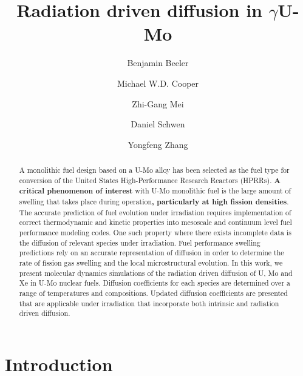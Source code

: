 \documentclass[review]{elsarticle}
\providecommand{\DIFaddtex}[1]{{\bf #1}} %
\providecommand{\DIFdeltex}[1]{} %
\providecommand{\DIFaddbegin}{\protect\color{blue}} %
\providecommand{\DIFaddend}{\protect\color{black}} %
\providecommand{\DIFdelbegin}{\protect\color{red}} %
\providecommand{\DIFdelend}{\protect\color{black}} %
\providecommand{\DIFadd}[1]{\texorpdfstring{\DIFaddtex{#1}}{#1}} %
\providecommand{\DIFdel}[1]{\texorpdfstring{\DIFdeltex{#1}}{}} %
\newcommand{\DIFscaledelfig}{0.5}
\newlength{\DIFdelgraphicswidth} %
\newlength{\DIFdelgraphicsheight} %
\newcommand{\DIFaddincludegraphics}[2][]{{\color{blue}\fbox{\DIFOincludegraphics[#1]{#2}}}} %
\newcommand{\DIFdelincludegraphics}[2][]{%
\sbox{\DIFdelgraphicsbox}{\DIFOincludegraphics[#1]{#2}}%
\settoboxwidth{\DIFdelgraphicswidth}{\DIFdelgraphicsbox} %
\settoboxtotalheight{\DIFdelgraphicsheight}{\DIFdelgraphicsbox} %
\scalebox{\DIFscaledelfig}{%
\parbox[b]{\DIFdelgraphicswidth}{\usebox{\DIFdelgraphicsbox}\\[-\baselineskip] \rule{\DIFdelgraphicswidth}{0em}}\llap{\resizebox{\DIFdelgraphicswidth}{\DIFdelgraphicsheight}{%
\setlength{\unitlength}{\DIFdelgraphicswidth}%
\begin{picture}(1,1)%
\thicklines\linethickness{2pt} %
{\color[rgb]{1,0,0}\put(0,0){\framebox(1,1){}}}%
{\color[rgb]{1,0,0}\put(0,0){\line( 1,1){1}}}%
{\color[rgb]{1,0,0}\put(0,1){\line(1,-1){1}}}%
\end{picture}%
}\hspace*{3pt}}} %
} %
\DeclareRobustCommand{\DIFaddbegin}{\DIFOaddbegin \let\includegraphics\DIFaddincludegraphics} %
\DeclareRobustCommand{\DIFaddend}{\DIFOaddend \let\includegraphics\DIFOincludegraphics} %
\DeclareRobustCommand{\DIFdelbegin}{\DIFOdelbegin \let\includegraphics\DIFdelincludegraphics} %
\DeclareRobustCommand{\DIFdelend}{\DIFOaddend \let\includegraphics\DIFOincludegraphics} %
\begin{document}
\begin{frontmatter}
\title{Radiation driven diffusion in $\gamma$U-Mo}

\author[ncsu,inl]{Benjamin Beeler}
\author[lanl]{Michael W.D. Cooper}
\author[anl]{Zhi-Gang Mei}
\author[inl]{Daniel Schwen}
\author[wisc,inl]{Yongfeng Zhang}
\address[ncsu]{North Carolina State University, Raleigh, NC 27695}
\address[inl]{Idaho National Laboratory, Idaho Falls, ID 83415}
\address[lanl]{Los Alamos National Laboratory, Los Alamos, NM 87545}
\address[anl]{Argonne National Laboratory, Lemont, IL 60439}
\address[wisc]{University of Wisconsin-Madison, Madison, WI 53715}

\begin{abstract}
A monolithic fuel design based on a U-Mo alloy has been selected as the fuel type for conversion of the United States High-Performance Research Reactors (HPRRs). \DIFdelbegin \DIFdel{An issue }\DIFdelend \DIFaddbegin \DIFadd{A critical phenomenon of interest }\DIFaddend with U-Mo monolithic fuel is the large amount of swelling that takes place during operation\DIFaddbegin \DIFadd{, particularly at high fission densities}\DIFaddend . The accurate prediction of fuel evolution under irradiation requires implementation of correct thermodynamic and kinetic properties into mesoscale and continuum level fuel performance modeling codes. One such property where there exists incomplete data is the diffusion of relevant species under irradiation. Fuel performance swelling predictions rely on an accurate representation of diffusion in order to determine the rate of fission gas swelling and the local microstructural evolution. In this work, we present molecular dynamics simulations of the radiation driven diffusion of U, Mo and Xe in U-Mo nuclear fuels. Diffusion coefficients for each species are determined over a range of temperatures and compositions. Updated diffusion coefficients are presented that are applicable under irradiation that incorporate both intrinsic and radiation driven diffusion. 


\end{abstract}
\end{frontmatter}

\linenumbers
\modulolinenumbers[5]

\section{Introduction}
\end{document}
